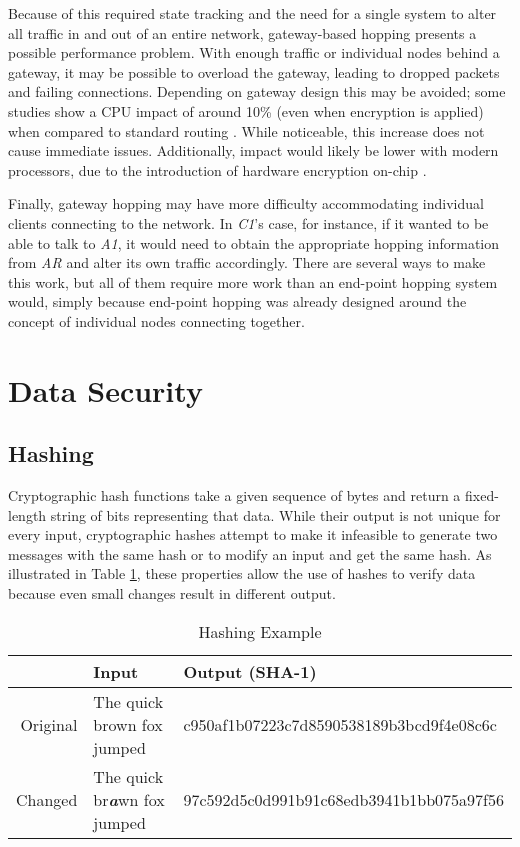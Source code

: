 \par Because of this required state tracking and the need for a single system to alter all traffic in and out of an entire network, gateway-based hopping presents a possible performance problem. With enough traffic or individual nodes behind a gateway, it may be possible to overload the gateway, leading to dropped packets and failing connections. Depending on gateway design this may be avoided; some studies show a CPU impact of around 10\% (even when encryption is applied) when compared to standard routing \cite{TAO}. While noticeable, this increase does not cause immediate issues. Additionally, impact would likely be lower with modern processors, due to the introduction of hardware encryption on-chip \cite{AESNISHA3}.

\par Finally, gateway hopping may have more difficulty accommodating individual clients connecting to the network. In \textit{C1}'s case, for instance, if it wanted to be able to talk to \textit{A1}, it would need to obtain the appropriate hopping information from \textit{AR} and alter its own traffic accordingly. There are several ways to make this work, but all of them require more work than an end-point hopping system would, simply because end-point hopping was already designed around the concept of individual nodes connecting together.

\section{Data Security}
\label{sec:data_security}

\subsection{Hashing}
\label{sec:hashing}
\par Cryptographic hash functions take a given sequence of bytes and return a fixed-length string of bits representing that data. While their output is not unique for every input, cryptographic hashes attempt to make it infeasible to generate two messages with the same hash or to modify an input and get the same hash. As illustrated in Table \ref{tbl:hashing_example}, these properties allow the use of hashes to verify data because even small changes result in different output.

\begin{table}[h]
\caption{Hashing Example}
\label{tbl:hashing_example}
\centering
\begin{tabular}{r|l|l}
	& \textbf{Input}  & \textbf{Output (SHA-1)} \\
\hline
Original & The quick brown fox jumped & c950af1b07223c7d8590538189b3bcd9f4e08c6c\\
Changed & The quick br\textit{\textbf{a}}wn fox jumped & 97c592d5c0d991b91c68edb3941b1bb075a97f56
\end{tabular}
\end{table}

